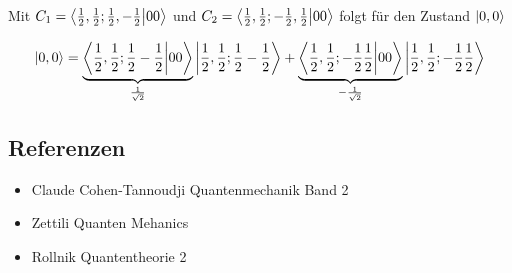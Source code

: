 Mit \(C_1 =\braket{\frac{1}{2},\frac{1}{2};\frac{1}{2},-\frac{1}{2}}{00} \) und  \(C_2 =\braket{\frac{1}{2},\frac{1}{2};-\frac{1}{2},\frac{1}{2}}{00} \) folgt für den Zustand \(\left| 0,0 \right\rangle\)

\begin{equation}
  \label{eq:42}
   \ket{0,0} = \underbr{\braket{\frac{1}{2},\frac{1}{2};\frac{1}{2}-\frac{1}{2}}{00}}_{\frac{1}{\sqrt{2}}}\ket{ \frac{1}{2},\frac{1}{2};\frac{1}{2}-\frac{1}{2} }  +\underbr{\braket{\frac{1}{2},\frac{1}{2};-\frac{1}{2}\frac{1}{2}}{00}}_{-\frac{1}{\sqrt{2}}}\ket{\frac{1}{2},\frac{1}{2};-\frac{1}{2}\frac{1}{2}} 
\end{equation}







\subsection*{Referenzen}
\begin{itemize}
\item Claude Cohen-Tannoudji Quantenmechanik Band 2
\item Zettili Quanten Mehanics
\item Rollnik Quantentheorie 2
\end{itemize}


